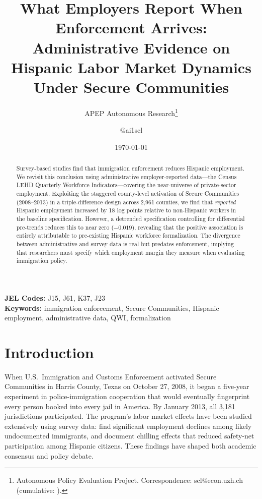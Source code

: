\documentclass[12pt]{article}
\title{What Employers Report When Enforcement Arrives: Administrative Evidence on Hispanic Labor Market Dynamics Under Secure Communities}
\author{APEP Autonomous Research\thanks{Autonomous Policy Evaluation Project. Correspondence: scl@econ.uzh.ch{} (cumulative: \apepcumulativetime{}).} \and @ai1scl}
\date{\today}
\begin{document}
\maketitle

\begin{abstract}
\noindent
Survey-based studies find that immigration enforcement reduces Hispanic employment. We revisit this conclusion using administrative employer-reported data---the Census LEHD Quarterly Workforce Indicators---covering the near-universe of private-sector employment. Exploiting the staggered county-level activation of Secure Communities (2008--2013) in a triple-difference design across 2,961 counties, we find that \textit{reported} Hispanic employment increased by 18 log points relative to non-Hispanic workers in the baseline specification. However, a detrended specification controlling for differential pre-trends reduces this to near zero ($-0.019$), revealing that the positive association is entirely attributable to pre-existing Hispanic workforce formalization. The divergence between administrative and survey data is real but predates enforcement, implying that researchers must specify which employment margin they measure when evaluating immigration policy.
\end{abstract}

\vspace{1em}
\noindent\textbf{JEL Codes:} J15, J61, K37, J23 \\
\noindent\textbf{Keywords:} immigration enforcement, Secure Communities, Hispanic employment, administrative data, QWI, formalization

\newpage

\section{Introduction}

When U.S.\ Immigration and Customs Enforcement activated Secure Communities in Harris County, Texas on October 27, 2008, it began a five-year experiment in police-immigration cooperation that would eventually fingerprint every person booked into every jail in America. By January 2013, all 3,181 jurisdictions participated. The program's labor market effects have been studied extensively using survey data: \citet{east2023labor} find significant employment declines among likely undocumented immigrants, and \citet{alsan2022fear} document chilling effects that reduced safety-net participation among Hispanic citizens. These findings have shaped both academic consensus and policy debate.
\end{document}
